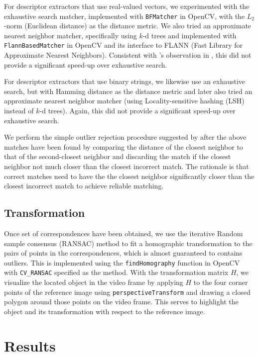 \documentclass[11pt]{article} %
\theoremstyle{plain}
\theoremstyle{definition}
\theoremstyle{remark}
\numberwithin{equation}{section} %
\numberwithin{figure}{section} %
\numberwithin{table}{section} %
\begin{document}
For descriptor extractors that use real-valued vectors, we experimented with the exhaustive 
search matcher, implemented with \texttt{BFMatcher} in OpenCV, with the $L_2$-norm (Euclidean 
distance) as the distance metric. We also tried an approximate nearest neighbor matcher, 
specifically using $k$-d trees and implemented with \texttt{FlannBasedMatcher} in OpenCV 
and its interface to FLANN (Fast Library for Approximate Nearest Neighbors). Consistent with 
\citeauthor{Lowe2004}'s observation in \citep{Lowe2004}, this did not provide a significant 
speed-up over exhaustive search. 

For descriptor extractors that use binary strings, we likewise use an exhaustive search, but
with Hamming distance as the distance metric and later also tried an approximate nearest neighbor 
matcher (using Locality-sensitive hashing (LSH) instead of $k$-d trees). Again, this did not 
provide a significant speed-up over exhaustive search. 

We perform the simple outlier rejection procedure suggested by \citeauthor{Lowe2004} after 
the above matches have been found by comparing the distance of the closest neighbor 
to that of the second-closest neighbor and discarding the match if the closest neighbor
not much closer than the closest incorrect match. The rationale is that correct matches need 
to have the the closest neighbor significantly closer than the closest incorrect match to 
achieve reliable matching.

\subsection{Transformation}

Once set of correspondences have been obtained, we use the iterative Random sample consensus 
(RANSAC) method to fit a homographic transformation to the pairs of points in the correspondences,
which is almost guaranteed to contains outliers. This is implemented using the \texttt{findHomography} 
function in OpenCV with \texttt{CV\_RANSAC} specified as the method. With the transformation 
matrix $H$, we visualize the located object in the video frame by applying $H$ to the four corner 
points of the reference image using \texttt{perspectiveTransform} and drawing a closed polygon 
around those points on the video frame. This serves to highlight the object and its transformation 
with respect to the reference image.

\section{Results} \label{sec:results}
\end{document}
